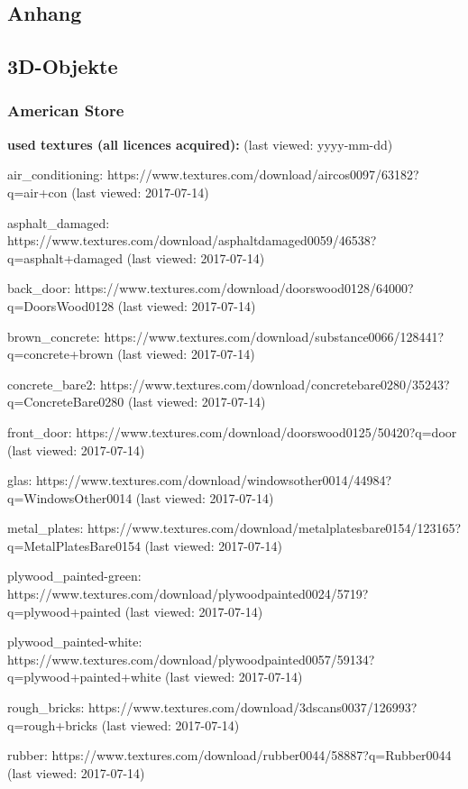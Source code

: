 \documentclass{Paper}
\begin{document}
\begin{appendix}
\section{Anhang}

\subsection{3D-Objekte}

\subsubsection{American Store}

\textbf{used textures (all licences acquired):}
(last viewed: yyyy-mm-dd)

air\_conditioning:
https://www.textures.com/download/aircos0097/63182?q=air+con
(last viewed: 2017-07-14)

asphalt\_damaged:
https://www.textures.com/download/asphaltdamaged0059/46538?q=asphalt+damaged
(last viewed: 2017-07-14)

back\_door:
https://www.textures.com/download/doorswood0128/64000?q=DoorsWood0128
(last viewed: 2017-07-14)

brown\_concrete:
https://www.textures.com/download/substance0066/128441?q=concrete+brown
(last viewed: 2017-07-14)

concrete\_bare2:
https://www.textures.com/download/concretebare0280/35243?q=ConcreteBare0280
(last viewed: 2017-07-14)

front\_door:
https://www.textures.com/download/doorswood0125/50420?q=door
(last viewed: 2017-07-14)

glas:
https://www.textures.com/download/windowsother0014/44984?q=WindowsOther0014
(last viewed: 2017-07-14)

metal\_plates:
https://www.textures.com/download/metalplatesbare0154/123165?q=MetalPlatesBare0154
(last viewed: 2017-07-14)

plywood\_painted-green:
https://www.textures.com/download/plywoodpainted0024/5719?q=plywood+painted
(last viewed: 2017-07-14)

plywood\_painted-white:
https://www.textures.com/download/plywoodpainted0057/59134?q=plywood+painted+white
(last viewed: 2017-07-14)

rough\_bricks:
https://www.textures.com/download/3dscans0037/126993?q=rough+bricks
(last viewed: 2017-07-14)

rubber:
https://www.textures.com/download/rubber0044/58887?q=Rubber0044
(last viewed: 2017-07-14)


\end{appendix}
\end{document}
